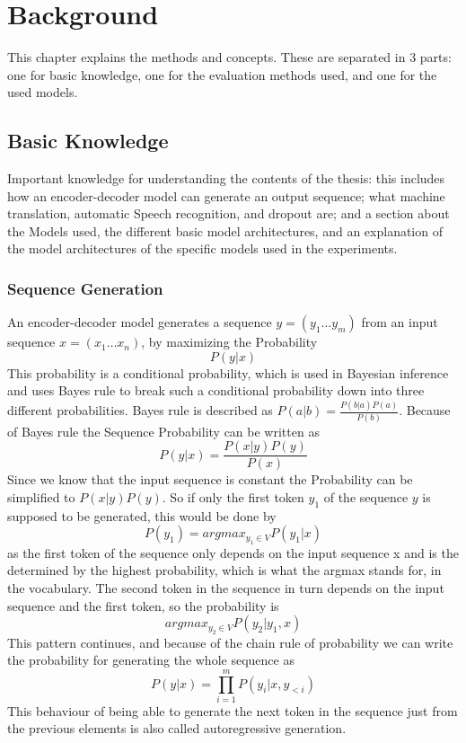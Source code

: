 \chapter{Background}
\label{ch:background}
This chapter explains the methods and concepts. These are separated in 3 parts: one for basic knowledge, one for the evaluation methods used, and one for the used models. 

\section{Basic Knowledge}
Important knowledge for understanding the contents of the thesis: this includes how an encoder-decoder model can generate an output sequence; what machine translation, automatic Speech recognition, and dropout are; and a section about the Models used, the different basic model architectures, and an explanation of the model architectures of the specific models used in the experiments.

\subsection{Sequence Generation}\label{sect: sequence generation}
An encoder-decoder model generates a sequence $y=(y_1\dots y_m)$ from an input sequence $x=(x_1\dots x_n)$, by maximizing the Probability $$P(y|x)$$
This probability is a conditional probability, which is used in Bayesian inference and uses Bayes rule to break such a conditional probability down into three different probabilities. Bayes rule is described as $P(a|b)=\frac{P(b|a)P(a)}{P(b)}$.
Because of Bayes rule the Sequence Probability can be written as $$P(y|x)= \frac{P(x|y)P(y)}{P(x)}$$ Since we know that the input sequence is constant the Probability can be simplified to $P(x|y)P(y)$.
So if only the first token $y_1$ of the sequence $y$ is supposed to be generated, this would be done by $$P(y_1)=argmax _{y_1\in V} P(y_1|x)$$ as the first token of the sequence only depends on the input sequence x and is the determined by the highest probability, which is what the argmax stands for, in the vocabulary. 
The second token in the sequence in turn depends on the input sequence and the first token, so the probability is 
$$argmax_{y_2\in V}P(y_2|y_1,x)$$ This pattern continues, and because of the chain rule of probability we can write the probability for generating the whole sequence as $$P(y|x)= \prod_{i=1}^m P(y_i|x, y_{<i})$$ \cite[chapters~3, 9.5, 10, 13]{jm3}
This behaviour of being able to generate the next token in the sequence just from the previous elements is also called autoregressive generation. 

